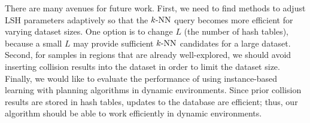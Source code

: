 There are many avenues for future work. First, we need to find methods to adjust LSH parameters adaptively so that the $k\text{-NN}$ query becomes more efficient for varying dataset sizes. One option is to change $L$ (the number of hash tables), because a small $L$ may provide sufficient $k\text{-NN}$ candidates for a large dataset. Second, for samples in regions that are already well-explored, we should avoid inserting collision results into the dataset in order to limit the dataset size. Finally, we would like to evaluate the performance of using instance-based learning with planning algorithms in dynamic environments. Since prior collision results are stored in hash tables, updates to the database are efficient; thus, our algorithm should be able to work efficiently in dynamic environments.




